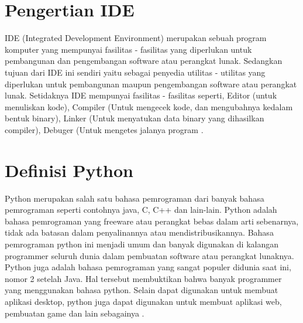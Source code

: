 


\section {Pengertian IDE}
IDE (Integrated Development Environment) merupakan sebuah program komputer yang mempunyai fasilitas - fasilitas yang 
diperlukan untuk pembangunan dan pengembangan software atau perangkat lunak. Sedangkan tujuan dari IDE ini sendiri 
yaitu sebagai penyedia utilitas - utilitas yang diperlukan untuk pembangunan maupun pengembangan software atau perangkat lunak.
Setidaknya IDE mempunyai fasilitas - fasilitas seperti, Editor (untuk menuliskan kode), Compiler (Untuk mengecek kode, 
dan mengubahnya kedalam bentuk binary), Linker (Untuk menyatukan data binary yang dihasilkan compiler), Debuger (Untuk mengetes jalanya program \cite{aripurnamayana2012rancangan}.


\section{Definisi Python}
Python merupakan salah satu bahasa pemrograman dari banyak bahasa pemrograman seperti contohnya java, C, C++ dan lain-lain. Python adalah bahasa pemrograman yang freeware atau perangkat bebas dalam arti sebenarnya, tidak ada batasan dalam penyalinannya atau mendistribusikannya. Bahasa pemrograman python ini menjadi umum dan banyak digunakan di kalangan programmer seluruh dunia dalam pembuatan software atau perangkat lunaknya. Python juga adalah bahasa pemrograman yang sangat populer didunia saat ini, nomor 2 setelah Java. Hal tersebut membuktikan bahwa banyak programmer yang menggunakan bahasa python. Selain dapat digunakan untuk membuat aplikasi desktop, python juga dapat digunakan untuk membuat aplikasi web, pembuatan game dan lain sebagainya \cite{malikhah2016eksplorasi}.

